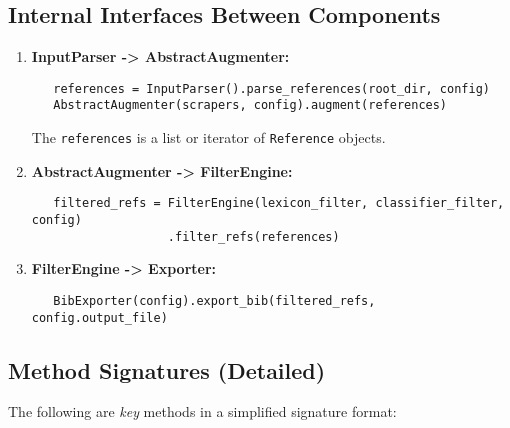\documentclass[12pt]{article}
\begin{document}
\subsection{Internal Interfaces Between Components}

\begin{enumerate}[label=\arabic*]
  \item \textbf{InputParser -> AbstractAugmenter:}
  \begin{verbatim}
   references = InputParser().parse_references(root_dir, config)
   AbstractAugmenter(scrapers, config).augment(references)
  \end{verbatim}
  The \texttt{references} is a list or iterator of \texttt{Reference} objects.

  \item \textbf{AbstractAugmenter -> FilterEngine:}
  \begin{verbatim}
   filtered_refs = FilterEngine(lexicon_filter, classifier_filter, config)
                   .filter_refs(references)
  \end{verbatim}

  \item \textbf{FilterEngine -> Exporter:}
  \begin{verbatim}
   BibExporter(config).export_bib(filtered_refs, config.output_file)
  \end{verbatim}
\end{enumerate}

\subsection{Method Signatures (Detailed)}
The following are \emph{key} methods in a simplified signature format:
\end{document}
